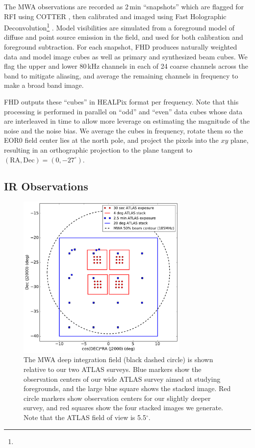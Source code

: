 \documentclass{emulateapj}
\begin{document}
The MWA observations are recorded as 2\,min ``snapshots'' which are flagged for RFI using COTTER \citep{AndreMWARFI}, then calibrated and imaged using Fast Holographic Deconvolution\footnote{} \citep{fhd}. Model visibilities are simulated from a foreground model of diffuse \citep{beardsley16} and point source \citep{PattiCatalog1} emission in the field, and used for both calibration and foreground subtraction. For each snapshot, FHD produces naturally weighted data and model image cubes as well as primary and synthesized beam cubes. We flag the upper and lower 80\,kHz channels in each of 24 coarse channels across the band to mitigate aliasing, and average the remaining channels in frequency to make a broad band image. 

FHD outputs these ``cubes'' in HEALPix format per frequency. Note that this processing is performed in parallel on ``odd'' and ``even'' data cubes whose data are interleaved in time to allow more leverage on estimating the magnitude of the noise and the noise bias. We average the cubes in frequency, rotate them so the EOR0 field center lies at the north pole, and project the pixels into the $xy$ plane, resulting in an orthographic projection to the plane tangent to  $(\text{RA}, \text{Dec})=(0,-27^\circ)$.

\subsection{IR Observations}

\begin{figure}[h]
\centering
\includegraphics[width=3.3in]{images/survey_overview.pdf}
\caption{The MWA deep integration field (black dashed circle) is shown relative to our two ATLAS surveys. Blue markers show the observation centers of our wide ATLAS survey aimed at studying foregrounds, and the large blue square shows the stacked image. Red circle markers show observation centers for our slightly deeper survey, and red squares show the four stacked images we generate. Note that the ATLAS field of view is 5.5$^\circ$.}
\label{fig:surveyoverview}
\end{figure}
\end{document}
